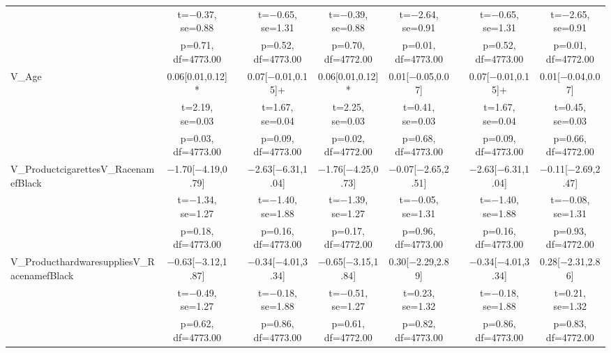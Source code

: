 \documentclass[]{report}
\begin{document}
\begin{table}
{\begin{tabular}[t]{lcccccccc}
		& t=\num{-0.37}, se=\num{0.88} &  & t=\num{-0.65}, se=\num{1.31} & t=\num{-0.39}, se=\num{0.88} & t=\num{-2.64}, se=\num{0.91} &  & t=\num{-0.65}, se=\num{1.31} & t=\num{-2.65}, se=\num{0.91}\\
		& p=\num{0.71}, df=\num{4773.00} &  & p=\num{0.52}, df=\num{4773.00} & p=\num{0.70}, df=\num{4772.00} & p=\num{0.01}, df=\num{4773.00} &  & p=\num{0.52}, df=\num{4773.00} & p=\num{0.01}, df=\num{4772.00}\\
		V\_Age & \num{0.06}[\num{0.01},\num{0.12}]* &  & \num{0.07}[\num{-0.01},\num{0.15}]+ & \num{0.06}[\num{0.01},\num{0.12}]* & \num{0.01}[\num{-0.05},\num{0.07}] &  & \num{0.07}[\num{-0.01},\num{0.15}]+ & \num{0.01}[\num{-0.04},\num{0.07}]\\
		& t=\num{2.19}, se=\num{0.03} &  & t=\num{1.67}, se=\num{0.04} & t=\num{2.25}, se=\num{0.03} & t=\num{0.41}, se=\num{0.03} &  & t=\num{1.67}, se=\num{0.04} & t=\num{0.45}, se=\num{0.03}\\
		& p=\num{0.03}, df=\num{4773.00} &  & p=\num{0.09}, df=\num{4773.00} & p=\num{0.02}, df=\num{4772.00} & p=\num{0.68}, df=\num{4773.00} &  & p=\num{0.09}, df=\num{4773.00} & p=\num{0.66}, df=\num{4772.00}\\
		V\_ProductcigarettesV\_RacenamefBlack & \num{-1.70}[\num{-4.19},\num{0.79}] &  & \num{-2.63}[\num{-6.31},\num{1.04}] & \num{-1.76}[\num{-4.25},\num{0.73}] & \num{-0.07}[\num{-2.65},\num{2.51}] &  & \num{-2.63}[\num{-6.31},\num{1.04}] & \num{-0.11}[\num{-2.69},\num{2.47}]\\
		& t=\num{-1.34}, se=\num{1.27} &  & t=\num{-1.40}, se=\num{1.88} & t=\num{-1.39}, se=\num{1.27} & t=\num{-0.05}, se=\num{1.31} &  & t=\num{-1.40}, se=\num{1.88} & t=\num{-0.08}, se=\num{1.31}\\
		& p=\num{0.18}, df=\num{4773.00} &  & p=\num{0.16}, df=\num{4773.00} & p=\num{0.17}, df=\num{4772.00} & p=\num{0.96}, df=\num{4773.00} &  & p=\num{0.16}, df=\num{4773.00} & p=\num{0.93}, df=\num{4772.00}\\
		V\_ProducthardwaresuppliesV\_RacenamefBlack & \num{-0.63}[\num{-3.12},\num{1.87}] &  & \num{-0.34}[\num{-4.01},\num{3.34}] & \num{-0.65}[\num{-3.15},\num{1.84}] & \num{0.30}[\num{-2.29},\num{2.89}] &  & \num{-0.34}[\num{-4.01},\num{3.34}] & \num{0.28}[\num{-2.31},\num{2.86}]\\
		& t=\num{-0.49}, se=\num{1.27} &  & t=\num{-0.18}, se=\num{1.88} & t=\num{-0.51}, se=\num{1.27} & t=\num{0.23}, se=\num{1.32} &  & t=\num{-0.18}, se=\num{1.88} & t=\num{0.21}, se=\num{1.32}\\
		& p=\num{0.62}, df=\num{4773.00} &  & p=\num{0.86}, df=\num{4773.00} & p=\num{0.61}, df=\num{4772.00} & p=\num{0.82}, df=\num{4773.00} &  & p=\num{0.86}, df=\num{4773.00} & p=\num{0.83}, df=\num{4772.00}\\

\end{tabular}}
\end{table}
\end{document}
